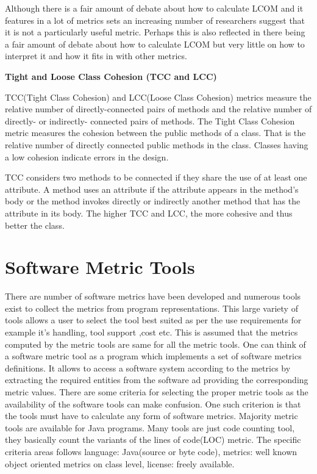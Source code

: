 Although there is a fair amount of debate about how to calculate LCOM and it features in a lot of metrics sets an increasing number of researchers suggest that it is not a particularly useful metric. Perhaps this is also reflected in there being a fair amount of debate about how to calculate LCOM but very little on how to interpret it and how it fits in with other metrics. 

\textbf{Tight and Loose Class Cohesion (TCC and LCC)}

TCC(Tight Class Cohesion) and LCC(Loose Class Cohesion) metrics measure  the  relative number of directly-connected pairs of methods and the   relative   number of directly- or indirectly- connected pairs of methods.
The Tight Class Cohesion metric measures the cohesion between the public methods of a class. That is the relative number of directly connected public methods in the class. Classes having a low cohesion indicate errors in the design.

TCC considers two methods to be connected if they share the  use  of  at  least  one  attribute.  A  method  uses  an  attribute if the attribute appears in the method’s body or  the  method  invokes  directly  or  indirectly  another method   that   has   the   attribute   in   its   body.   
The higher TCC and LCC, the more cohesive and thus better the class.



\section{Software Metric Tools}
There are number of software metrics have been developed and numerous tools exist to collect the metrics from program representations. This large variety of tools allows a user to select the tool best suited as per the use requirements for example it's handling, tool support ,cost etc. This is assumed that the metrics computed by the metric tools are same for all the metric tools. One can think of a software metric tool as a program which implements a set of software metrics definitions. It allows to access a software system according to the metrics by extracting the required entities from the software ad providing the corresponding metric values. There are
some criteria for selecting the proper metric tools as the availability of the software tools can make confusion. One such criterion is that the tools must have to calculate any form of software metrics. Majority metric tools are available for Java programs. Many tools are just code counting
tool, they basically count the variants of the lines of code(LOC) metric. The specific criteria areas follows language: Java(source or byte code), metrics: well known object oriented metrics on class level, license: freely available.

